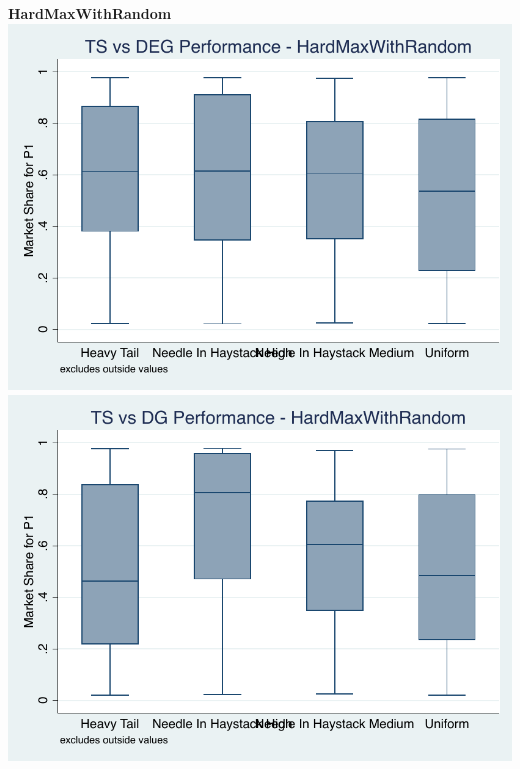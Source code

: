 \documentclass[11pt,letterpaper]{article}
\begin{document}
\pagebreak
\textbf{HardMaxWithRandom} \\
\includegraphics[scale=0.75]{hmr_ts_deg_prior} \\
\includegraphics[scale=0.75]{hmr_ts_dg_prior} \\
\end{document}
